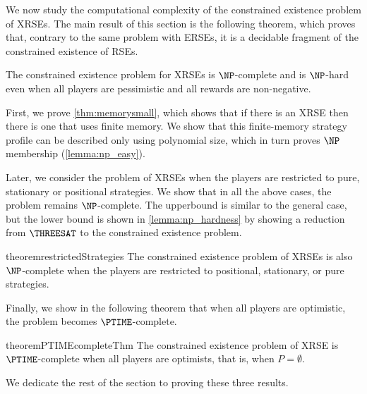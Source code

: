 We now study the computational complexity of the constrained existence problem of XRSEs.
The main result of this section is the following theorem, which proves that, contrary to the same problem with ERSEs, it is a decidable fragment of the constrained existence of RSEs.

\begin{theorem}\label{thm:NPcomplete}
    The constrained existence problem for XRSEs is $\NP$-complete and is $\NP$-hard even when all players are pessimistic and all rewards are non-negative.
\end{theorem}

First, we prove \cref{thm:memorysmall}, which shows that if there is an XRSE then there is one that uses finite memory. We show that this finite-memory strategy profile can be described only using polynomial size, which in turn proves $\NP$ membership (\cref{lemma:np_easy}).

Later, we consider the problem of XRSEs when the players are restricted to pure, stationary or positional strategies. We show that in all the above cases, the problem remains $\NP$-complete. The upperbound is similar to the general case, but the lower bound is shown in \cref{lemma:np_hardness} by showing a reduction from $\THREESAT$ to the constrained existence problem. 
\begin{restatable}{theorem}{restrictedStrategies}\label{thm:infinite_rho_restricted_strategy_np_easy}
    The constrained existence problem of XRSEs is also $\NP$-complete when the players are restricted to positional, stationary,  or pure strategies. 
\end{restatable}

Finally, we show in the following theorem that when all players are optimistic, the problem becomes $\PTIME$-complete. 
\begin{restatable}{theorem}{PTIMEcompleteThm}\label{thm:PTIMEcomplete}
    The constrained existence problem of XRSE is $\PTIME$-complete when all players are optimists, that is, when $P=\emptyset$.
\end{restatable} %
We dedicate the rest of the section to proving these three results. 
